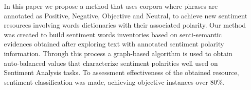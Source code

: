 In this paper we propose a method that uses corpora where phrases are annotated as Positive, Negative, Objective and Neutral, to achieve new sentiment
 resources involving words dictionaries with their associated polarity. Our
 method was created to build sentiment words inventories based on senti-semantic
 evidences obtained after exploring text with annotated sentiment polarity
 information. Through this process a graph-based algorithm is used to obtain
 auto-balanced values that characterize sentiment polarities well used on
 Sentiment Analysis tasks. To assessment effectiveness of the obtained resource,
 sentiment classification was made, achieving objective instances over 80\%.

